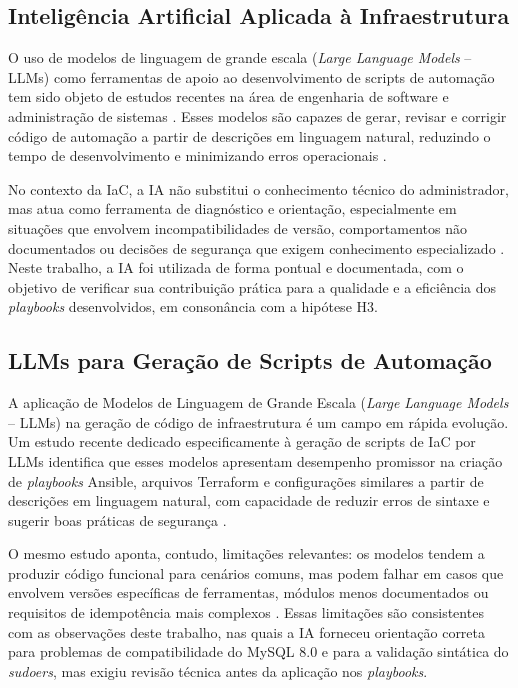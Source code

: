 \documentclass[12pt]{article}
\begin{document}
\subsection{Inteligência Artificial Aplicada à Infraestrutura}

O uso de modelos de linguagem de grande escala (\textit{Large Language Models} -- LLMs) como ferramentas de apoio ao desenvolvimento de scripts de automação tem sido objeto de estudos recentes na área de engenharia de software e administração de sistemas \cite{pucpr2025}. Esses modelos são capazes de gerar, revisar e corrigir código de automação a partir de descrições em linguagem natural, reduzindo o tempo de desenvolvimento e minimizando erros operacionais \cite{kim2018}.

No contexto da IaC, a IA não substitui o conhecimento técnico do administrador, mas atua como ferramenta de diagnóstico e orientação, especialmente em situações que envolvem incompatibilidades de versão, comportamentos não documentados ou decisões de segurança que exigem conhecimento especializado \cite{pucpr2025}. Neste trabalho, a IA foi utilizada de forma pontual e documentada, com o objetivo de verificar sua contribuição prática para a qualidade e a eficiência dos \textit{playbooks} desenvolvidos, em consonância com a hipótese H3.

\subsection{LLMs para Geração de Scripts de Automação}

A aplicação de Modelos de Linguagem de Grande Escala (\textit{Large Language Models} -- LLMs) na geração de código de infraestrutura é um campo em rápida evolução. Um estudo recente dedicado especificamente à geração de scripts de IaC por LLMs identifica que esses modelos apresentam desempenho promissor na criação de \textit{playbooks} Ansible, arquivos Terraform e configurações similares a partir de descrições em linguagem natural, com capacidade de reduzir erros de sintaxe e sugerir boas práticas de segurança \cite{liu2024llmiac}.

O mesmo estudo aponta, contudo, limitações relevantes: os modelos tendem a produzir código funcional para cenários comuns, mas podem falhar em casos que envolvem versões específicas de ferramentas, módulos menos documentados ou requisitos de idempotência mais complexos \cite{liu2024llmiac}. Essas limitações são consistentes com as observações deste trabalho, nas quais a IA forneceu orientação correta para problemas de compatibilidade do MySQL 8.0 e para a validação sintática do \textit{sudoers}, mas exigiu revisão técnica antes da aplicação nos \textit{playbooks}.
\end{document}
